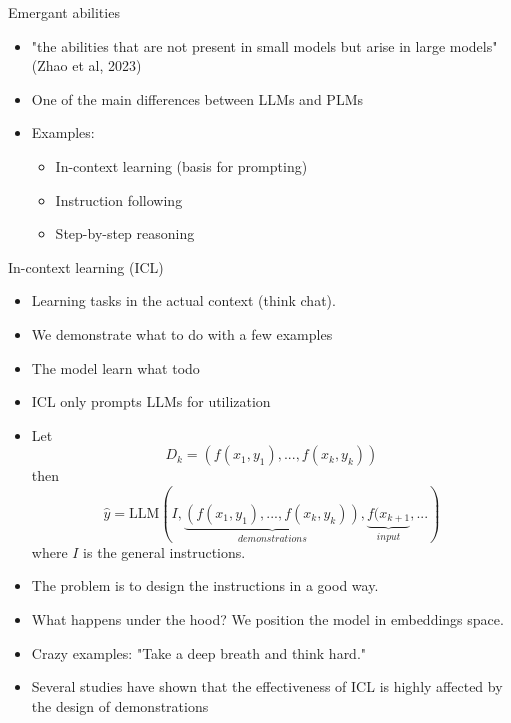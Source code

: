 \documentclass[10pt]{beamer}
\begin{document}


\begin{frame}{Emergant abilities}
\begin{itemize}
\item "the abilities that are not present in small models but arise in large models" (Zhao et al, 2023)
\item One of the main differences between LLMs and PLMs
\item Examples:
\begin{itemize}
\item In-context learning (basis for prompting)
\item Instruction following %
\item Step-by-step reasoning
\end{itemize}
\end{itemize}



\end{frame}


\begin{frame}{In-context learning (ICL)}

\begin{itemize}
\item Learning tasks in the actual context (think chat).
\item We demonstrate what to do with a few examples
\item The model learn what todo 
\item ICL only prompts LLMs for utilization
\item Let
\[
D_k = \left(f(x_1, y_1),...,f(x_k, y_k) \right)
\]
then
\[
\hat{y} = \text{LLM}(I, \underbrace{\left(f(x_1, y_1),...,f(x_k, y_k)\right)}_{demonstrations}, \underbrace{f(x_{k+1}}_{input} , ...)
\]
where $I$ is the general instructions.
\item The problem is to design the instructions in a good way.
\item What happens under the hood? We position the model in embeddings space.
\item Crazy examples: "Take a deep breath and think hard."
\item Several studies have shown that the effectiveness of ICL is highly affected by the design of demonstrations %

\end{itemize}


\end{frame}
\end{document}
